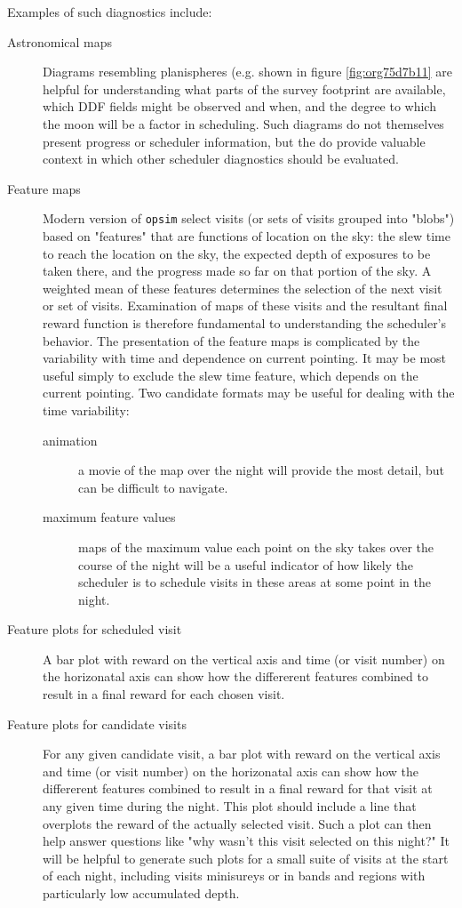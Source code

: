 Examples of such diagnostics include:
\begin{description}
\item[{Astronomical maps}] Diagrams resembling planispheres (e.g. shown in figure \ref{fig:org75d7b11} are helpful for understanding what parts of the survey footprint are available, which DDF fields might be observed and when, and the degree to which the moon will be a factor in scheduling. Such diagrams do not themselves present progress or scheduler information, but the do provide valuable context in which other scheduler diagnostics should be evaluated.
\item[{Feature maps}] Modern version of \texttt{opsim} select visits (or sets of visits grouped into "blobs") based on "features" that are functions of location on the sky: the slew time to reach the location on the sky, the expected depth of exposures to be taken there, and the progress made so far on that portion of the sky. A weighted mean of these features determines the selection of the next visit or set of visits. Examination of maps of these visits and the resultant final reward function is therefore fundamental to understanding the scheduler's behavior. The presentation of the feature maps is complicated by the variability with time and dependence on current pointing. It may be most useful simply to exclude the slew time feature, which depends on the current pointing. Two candidate formats may be useful for dealing with the time variability:
\begin{description}
\item[{animation}] a movie of the map over the night will provide the most detail, but can be difficult to navigate.
\item[{maximum feature values}] maps of the maximum value each point on the sky takes over the course of the night will be a useful indicator of how likely the scheduler is to schedule visits in these areas at some point in the night.
\end{description}
\item[{Feature plots for scheduled visit}] A bar plot with reward on the vertical axis and time (or visit number) on the horizonatal axis can show how the differerent features combined to result in a final reward for each chosen visit.
\item[{Feature plots for candidate visits}] For any given candidate visit, a bar plot with reward on the vertical axis and time (or visit number) on the horizonatal axis can show how the differerent features combined to result in a final reward for that visit at any given time during the night. This plot should include a line that overplots the reward of the actually selected visit. Such a plot can then help answer questions like "why wasn't this visit selected on this night?" It will be helpful to generate such plots for a small suite of visits at the start of each night, including visits minisureys or in bands and regions with particularly low accumulated depth.

\end{description}

